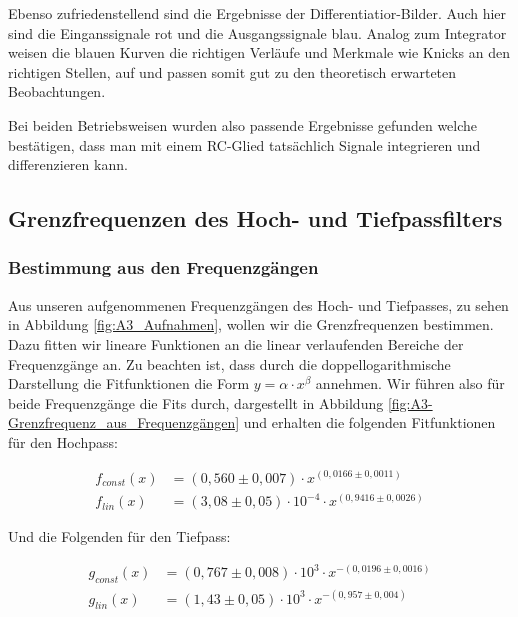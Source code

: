 \documentclass{article}
\begin{document}
Ebenso zufriedenstellend sind die Ergebnisse der Differentiatior-Bilder. Auch hier sind die Einganssignale rot und die Ausgangssignale blau. Analog zum Integrator weisen die blauen Kurven die richtigen Verläufe und Merkmale wie Knicks an den richtigen Stellen, auf und passen somit gut zu den theoretisch erwarteten Beobachtungen. 

Bei beiden Betriebsweisen wurden also passende Ergebnisse gefunden welche bestätigen, dass man mit einem RC-Glied tatsächlich Signale integrieren und differenzieren kann.  




\clearpage
\newpage

\subsection{Grenzfrequenzen des Hoch- und Tiefpassfilters}

\subsubsection{Bestimmung aus den Frequenzgängen} \label{chap:A3_frequenzgänge}

Aus unseren aufgenommenen Frequenzgängen des Hoch- und Tiefpasses, zu sehen in Abbildung \ref{fig:A3_Aufnahmen}, wollen wir die Grenzfrequenzen bestimmen. Dazu fitten wir lineare Funktionen an die linear verlaufenden Bereiche der Frequenzgänge an. Zu beachten ist, dass durch die doppellogarithmische Darstellung die Fitfunktionen die Form $y = \alpha \cdot x^\beta$ annehmen. Wir führen also für beide Frequenzgänge die Fits durch, dargestellt in Abbildung \ref{fig:A3-Grenzfrequenz_aus_Frequenzgängen} und erhalten die folgenden Fitfunktionen für den Hochpass:

\begin{equation}
    \begin{split}
        f_{const}(x) &= (0,560 \pm 0,007) \cdot x^{(0,0166 \pm 0,0011)} \\
        f_{lin}(x) &= (3,08 \pm 0,05) \cdot 10^{-4} \cdot x^{(0,9416 \pm 0,0026)}
    \end{split}
\end{equation}

Und die Folgenden für den Tiefpass:

\begin{equation}
    \begin{split}
        g_{const}(x) &= (0,767 \pm 0,008) \cdot 10^{3} \cdot x^{-(0,0196 \pm 0,0016)} \\
        g_{lin}(x) &= (1,43 \pm 0,05) \cdot 10^{3} \cdot x^{-(0,957 \pm 0,004)}
    \end{split}
\end{equation}
\end{document}

